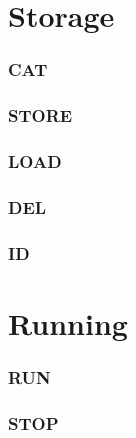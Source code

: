\documentclass{tufte-book} %
\begin{document}
\chapter{Storage}
\label{ch:4}
\subsection{CAT}
\subsection{STORE}
\subsection{LOAD}
\subsection{DEL}
\subsection{ID}




\chapter{Running}
\label{ch:5}
\subsection{RUN}

\subsection{STOP}


\end{document}
